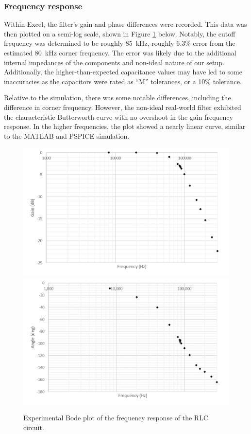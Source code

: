 \documentclass{report}
\begin{document}
\subsubsection{Frequency response}
Within Excel, the filter's gain and phase differences were recorded. This data was then plotted on a semi-log scale, shown in Figure \ref{fig:exp2bode} below. Notably, the cutoff frequency was determined to be roughly \SI{85}{\kHz}, roughly 6.3\% error from the estimated \SI{80}{\kHz} corner frequency. The error was likely due to the additional internal impedances of the components and non-ideal nature of our setup. Additionally, the higher-than-expected capacitance values may have led to some inaccuracies as the capacitors were rated as ``M'' tolerances, or a 10\% tolerance.

Relative to the simulation, there was some notable differences, including the difference in corner frequency. However, the non-ideal real-world filter exhibited the characteristic Butterworth curve with no overshoot in the gain-frequency response. In the higher frequencies, the plot showed a nearly linear curve, similar to the MATLAB and PSPICE simulation.
\begin{figure}[h]
	\centering
	\includegraphics[width=0.5\linewidth]{exp2_freq}\includegraphics[width=0.5\linewidth]{exp2_angle}
	\caption{Experimental Bode plot of the frequency response of the RLC circuit.}
	\label{fig:exp2bode}
\end{figure}
\end{document}

